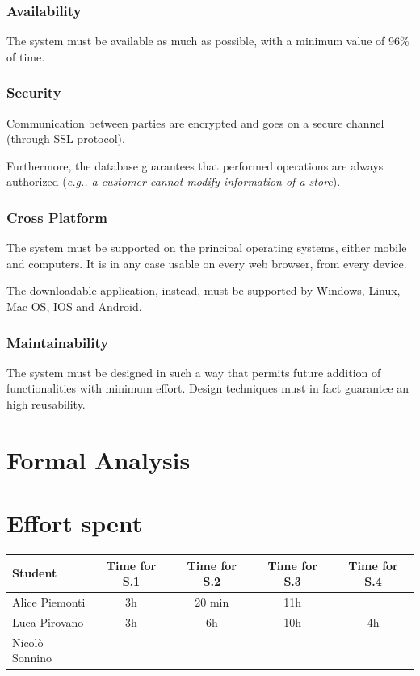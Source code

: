 \documentclass[table, 12pt]{article}
\begin{document}
\subsubsection{Availability}
The system must be available as much as possible, with a minimum value of 96\% of time.
\subsubsection{Security}
Communication between parties are encrypted and goes on a secure channel (through SSL protocol).

Furthermore, the database guarantees that performed operations are always authorized (\textit{e.g.. a customer cannot modify information of a store}).
\subsubsection{Cross Platform}
The system must be supported on the principal operating systems, either mobile and computers. It is in any case usable on every web browser, from every device.

The downloadable application, instead, must be supported by Windows, Linux, Mac OS, IOS and Android.
\subsubsection{Maintainability}
The system must be designed in such a way that permits future addition of functionalities with minimum effort.
Design techniques must in fact guarantee an high reusability.
\newpage
\section{Formal Analysis}
\newpage
\section{Effort spent}
\begin{tabular}{ | l || c | c | c | c |}
    \hline
    Student        & Time for S.1 & Time for S.2 & Time for S.3 & Time for S.4 \\ \hline
    Alice Piemonti & 3h           & 20 min       & 11h           &              \\ \hline
    Luca Pirovano  & 3h           & 6h           & 10h           & 4h           \\ \hline
    Nicolò Sonnino &              &              &              &              \\
    \hline
\end{tabular}
\end{document}

